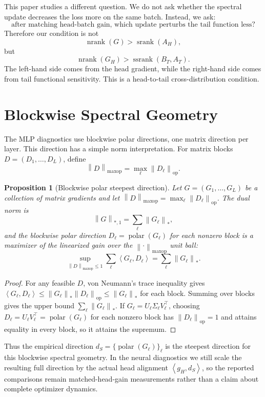 \documentclass{article}
\newtheorem{proposition}[theorem]{Proposition}
\theoremstyle{definition}
\newcommand{\op}{\mathrm{op}}
\newcommand{\norm}[1]{\left\lVert #1 \right\rVert}
\newcommand{\inner}[2]{\left\langle #1,#2 \right\rangle}
\newcommand{\srank}{\operatorname{srank}}
\newcommand{\nrank}{\operatorname{nrank}}
\newcommand{\ssrank}{\operatorname{ssrank}}
\newcommand{\polar}{\operatorname{polar}}
\begin{document}
This paper studies a different question. We do not ask whether the spectral update decreases the loss more on the same batch. Instead, we ask:
\[
\text{after matching head-batch gain, which update perturbs the tail function less?}
\]
Therefore our condition is not
\[
\nrank(G)>\srank(A_H),
\]
but
\[
\boxed{
\nrank(G_H)>\ssrank(B_T,A_T).
}
\]
The left-hand side comes from the head gradient, while the right-hand side comes from tail functional sensitivity. This is a head-to-tail cross-distribution condition.

\section{Blockwise Spectral Geometry}
\label{app:blockwise-geometry}

The MLP diagnostics use blockwise polar directions, one matrix direction per layer. This direction has a simple norm interpretation. For matrix blocks \(D=(D_1,\ldots,D_L)\), define
\[
\norm{D}_{\mathrm{maxop}}=\max_\ell \norm{D_\ell}_{\op}.
\]

\begin{proposition}[Blockwise polar steepest direction]
\label{prop:blockwise-polar}
Let \(G=(G_1,\ldots,G_L)\) be a collection of matrix gradients and let \(\norm{D}_{\mathrm{maxop}}=\max_\ell\norm{D_\ell}_{\op}\). The dual norm is
\[
\norm{G}_{*,1}=\sum_\ell \norm{G_\ell}_*,
\]
and the blockwise polar direction \(D_\ell=\polar(G_\ell)\) for each nonzero block is a maximizer of the linearized gain over the \(\norm{\cdot}_{\mathrm{maxop}}\) unit ball:
\[
\sup_{\norm{D}_{\mathrm{maxop}}\le 1}\sum_\ell \inner{G_\ell}{D_\ell}
=
\sum_\ell \norm{G_\ell}_*.
\]
\end{proposition}

\begin{proof}
For any feasible \(D\), von Neumann's trace inequality gives \(\inner{G_\ell}{D_\ell}\le\norm{G_\ell}_*\norm{D_\ell}_{\op}\le\norm{G_\ell}_*\) for each block. Summing over blocks gives the upper bound \(\sum_\ell\norm{G_\ell}_*\). If \(G_\ell=U_\ell\Sigma_\ell V_\ell^\top\), choosing \(D_\ell=U_\ell V_\ell^\top=\polar(G_\ell)\) for each nonzero block has \(\norm{D_\ell}_{\op}=1\) and attains equality in every block, so it attains the supremum.
\end{proof}

Thus the empirical direction \(d_S=\{\polar(G_\ell)\}_\ell\) is the steepest direction for this blockwise spectral geometry. In the neural diagnostics we still scale the resulting full direction by the actual head alignment \(\inner{g_H}{d_S}\), so the reported comparisons remain matched-head-gain measurements rather than a claim about complete optimizer dynamics.
\end{document}

